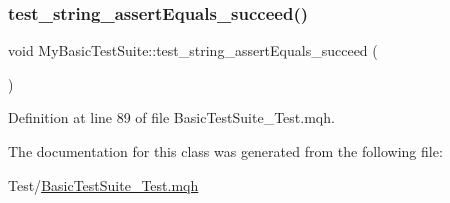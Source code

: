 \mbox{\label{class_my_basic_test_suite_ac6cfe0dda4c123f996129b55fd703865}} 
\subsubsection{\texorpdfstring{test\+\_\+string\+\_\+assert\+Equals\+\_\+succeed()}{test\_string\_assertEquals\_succeed()}}
{\footnotesize\ttfamily void My\+Basic\+Test\+Suite\+::test\+\_\+string\+\_\+assert\+Equals\+\_\+succeed (\begin{DoxyParamCaption}{ }\end{DoxyParamCaption})\hspace{0.3cm}{\ttfamily [inline]}}



Definition at line 89 of file Basic\+Test\+Suite\+\_\+\+Test.\+mqh.



The documentation for this class was generated from the following file\+:\begin{DoxyCompactItemize}
\item 
Test/\mbox{\hyperlink{_basic_test_suite___test_8mqh}{Basic\+Test\+Suite\+\_\+\+Test.\+mqh}}\end{DoxyCompactItemize}
